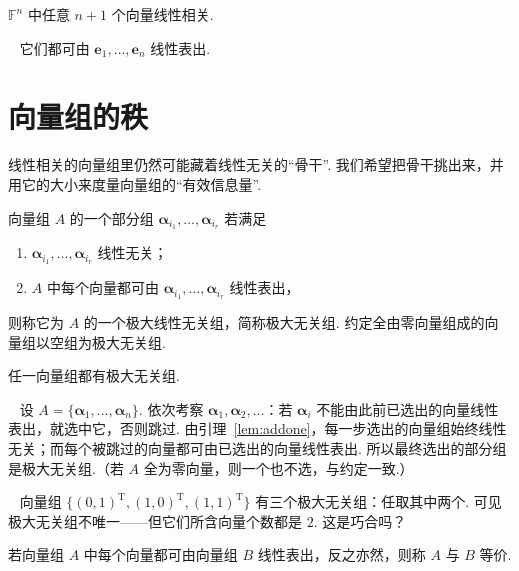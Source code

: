\documentclass[lang=cn,10.5pt,scheme=chinese,toc=twocol,section,chinesefont=nofont,
twoside,citestyle=gb7714-2015,bibstyle=gb7714-2015]{elegantbook}
\DeclareRobustCommand{\textbf}[1]{{\lnsemiboldlatin\lnsemiboldcjk #1}}
\newcommand{\vv}[1]{\boldsymbol{#1}}
\newcommand{\trans}{\mathrm{T}}             %
\numberwithin{equation}{section}   %
\newcommand*{\lnlabel}[1]{{\sffamily\bfseries\color{black}#1}}
\renewenvironment{example}[1][]{%
	\refstepcounter{exam}%
	\par\noindent\lnlabel{\examplename\ \theexam\ifblank{#1}{}{\ #1}}\ \rmfamily}{%
	\par\ignorespacesafterend}
\renewenvironment{proof}{%
	\par\noindent\lnlabel{\proofname}\;\ \color{black!90}\cfs}{\par}
\begin{document}
\begin{corollary}
  $\mathbb{F}^n$ 中任意 $n+1$ 个向量线性相关.
\end{corollary}
\begin{proof}
  它们都可由 $\vv e_1,\ldots,\vv e_n$ 线性表出.
\end{proof}

\section{向量组的秩}\label{sec:rank}

线性相关的向量组里仍然可能藏着线性无关的“骨干”. 我们希望把骨干挑出来，并用它的大小来度量向量组的“有效信息量”.

\begin{definition}
  \label{def:vecset}
  向量组 $A$ 的一个部分组 $\vv{\alpha}_{i_1},\ldots,\vv{\alpha}_{i_r}$ 若满足
  \begin{enumerate}
    \item $\vv{\alpha}_{i_1},\ldots,\vv{\alpha}_{i_r}$ 线性无关；
    \item $A$ 中每个向量都可由 $\vv{\alpha}_{i_1},\ldots,\vv{\alpha}_{i_r}$ 线性表出，
  \end{enumerate}
  则称它为 $A$ 的一个\textbf{极大线性无关组}，简称\textbf{极大无关组}. 约定全由零向量组成的向量组以空组为极大无关组.
\end{definition}

\begin{theorem}
  \label{thm:maxexist}
  任一向量组都有极大无关组.
\end{theorem}
\begin{proof}
  设 $A=\{\vv\alpha_1,\ldots,\vv\alpha_n\}$. 依次考察 $\vv\alpha_1,\vv\alpha_2,\ldots$：若 $\vv\alpha_i$ 不能由此前已选出的向量线性表出，就选中它，否则跳过. 由引理~\ref{lem:addone}，每一步选出的向量组始终线性无关；而每个被跳过的向量都可由已选出的向量线性表出. 所以最终选出的部分组是极大无关组.（若 $A$ 全为零向量，则一个也不选，与约定一致.）
\end{proof}

\begin{example}
  向量组 $\{(0,1)^\trans,(1,0)^\trans,(1,1)^\trans\}$ 有三个极大无关组：任取其中两个. 可见极大无关组不唯一——但它们所含向量个数都是 $2$. 这是巧合吗？
\end{example}

\begin{definition}
  \label{def:veceqv}
  若向量组 $A$ 中每个向量都可由向量组 $B$ 线性表出，反之亦然，则称 $A$ 与 $B$ \textbf{等价}.
\end{definition}
\end{document}
